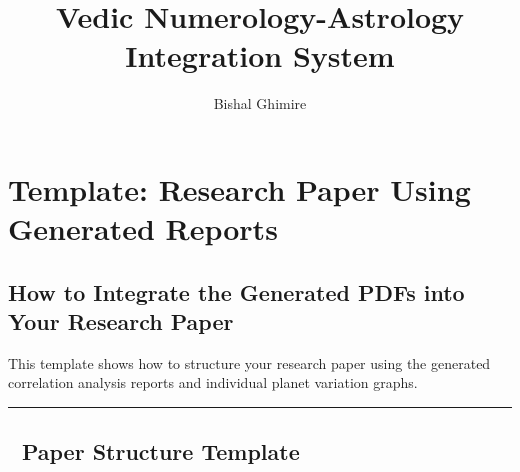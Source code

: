 \documentclass[
  11pt,
  oneside,
  openany]{scrbook}
\title{Vedic Numerology-Astrology Integration System}
\author{Bishal Ghimire}
\date{}
\begin{document}
\frontmatter
\maketitle



\mainmatter
\chapter{Template: Research Paper Using Generated
Reports}\label{template-research-paper-using-generated-reports}

\section{How to Integrate the Generated PDFs into Your Research
Paper}\label{how-to-integrate-the-generated-pdfs-into-your-research-paper}

This template shows how to structure your research paper using the
generated correlation analysis reports and individual planet variation
graphs.

\begin{center}\rule{0.5\linewidth}{0.5pt}\end{center}

\section{📄 Paper Structure Template}\label{paper-structure-template}
\end{document}
